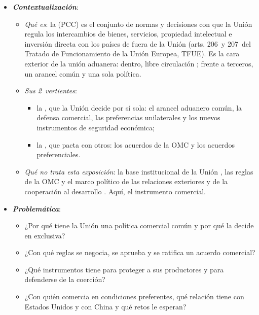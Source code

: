 \documentclass[11pt]{article}
\begin{document}
\begin{itemize}
\item \textbf{\emph{Contextualización}}:
  \begin{itemize}
  \item \emph{Qué es}: la  (PCC) es el conjunto de normas y decisiones con que la Unión regula los intercambios de bienes, servicios, propiedad intelectual e inversión directa con los países de fuera de la Unión (arts. 206~y 207~del Tratado de Funcionamiento de la Unión Europea, TFUE). Es la cara exterior de la unión aduanera: dentro, libre circulación ; frente a terceros, un arancel común y una sola política.
  \item \emph{Sus 2~vertientes}:
    \begin{itemize}
    \item la , que la Unión decide por sí sola: el arancel aduanero común, la defensa comercial, las preferencias unilaterales y los nuevos instrumentos de seguridad económica;
    \item la , que pacta con otros: los acuerdos de la OMC y los acuerdos preferenciales.
    \end{itemize}
  \item \emph{Qué no trata esta exposición}: la base institucional de la Unión , las reglas de la OMC   y el marco político de las relaciones exteriores y de la cooperación al desarrollo . Aquí, el instrumento comercial.
  \end{itemize}

\item \textbf{\emph{Problemática}}:
  \begin{itemize}
  \item ¿Por qué tiene la Unión una política comercial común y por qué la decide en exclusiva?
  \item ¿Con qué reglas se negocia, se aprueba y se ratifica un acuerdo comercial?
  \item ¿Qué instrumentos tiene para proteger a sus productores y para defenderse de la coerción?
  \item ¿Con quién comercia en condiciones preferentes, qué relación tiene con Estados Unidos y con China y qué retos le esperan?
  \end{itemize}


\end{itemize}
\end{document}
